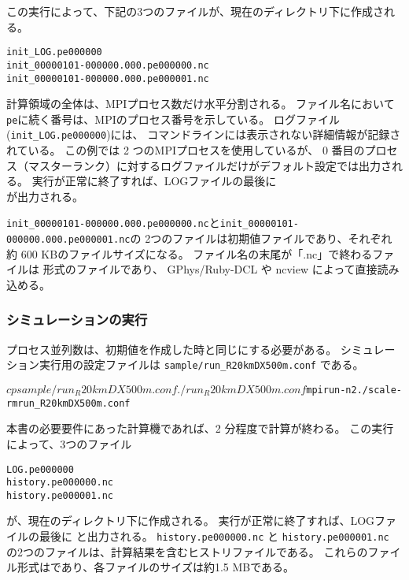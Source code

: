 \noindent この実行によって、下記の3つのファイルが、現在のディレクトリ下に作成される。
\begin{alltt}
  init_LOG.pe000000
  init_00000101-000000.000.pe000000.nc
  init_00000101-000000.000.pe000001.nc
\end{alltt}
計算領域の全体は、MPIプロセス数だけ水平分割される。
ファイル名において\verb|pe|に続く番号は、MPIのプロセス番号を示している。
ログファイル(\verb|init_LOG.pe000000|)には、
コマンドラインには表示されない詳細情報が記録されている。
この例では 2 つのMPIプロセスを使用しているが、
0 番目のプロセス（マスターランク）に対するログファイルだけがデフォルト設定では出力される。
実行が正常に終了すれば、LOGファイルの最後に\\
が出力される。

\verb|init_00000101-000000.000.pe000000.nc|と\verb|init_00000101-000000.000.pe000001.nc|の
2つのファイルは初期値ファイルであり、それぞれ約 600 KBのファイルサイズになる。
ファイル名の末尾が「.nc」で終わるファイルは {\netcdf}形式のファイルであり、
GPhys/Ruby-DCL や ncview によって直接読み込める。



\subsubsection{シミュレーションの実行} \label{subsec:ideal_exp_run}
プロセス並列数は、初期値を作成した時と同じにする必要がある。
シミュレーション実行用の設定ファイルは \verb|sample/run_R20kmDX500m.conf| である。
\begin{alltt}
  $ cp  sample/run_R20kmDX500m.conf  ./run_R20kmDX500m.conf
  $ mpirun  -n  2  ./scale-rm  run_R20kmDX500m.conf
\end{alltt}

本書の必要要件にあった計算機であれば、2 分程度で計算が終わる。
この実行によって、3つのファイル
\begin{alltt}
  LOG.pe000000
  history.pe000000.nc
  history.pe000001.nc
\end{alltt}
が、現在のディレクトリ下に作成される。
実行が正常に終了すれば、LOGファイルの最後に
と出力される。
\verb|history.pe000000.nc| と \verb|history.pe000001.nc|
の2つのファイルは、計算結果を含むヒストリファイルである。
これらのファイル形式は{\netcdf}であり、各ファイルのサイズは約1.5 MBである。
